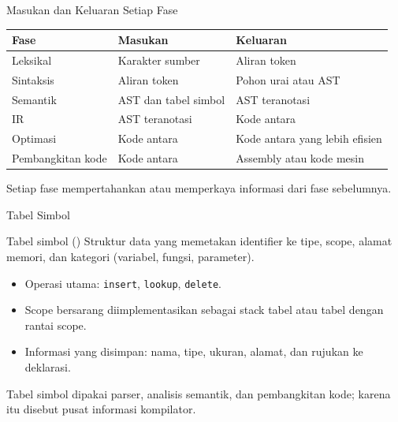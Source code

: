 \documentclass[aspectratio=169,10pt,t]{beamer}
\begin{document}
\begin{frame}{Masukan dan Keluaran Setiap Fase}
  \small
  \begin{tabular}{@{}p{3.1cm}p{5.2cm}p{5.2cm}@{}}
    \toprule
    \textbf{Fase} & \textbf{Masukan} & \textbf{Keluaran} \\
    \midrule
    Leksikal & Karakter sumber & Aliran token \\
    Sintaksis & Aliran token & Pohon urai atau AST \\
    Semantik & AST dan tabel simbol & AST teranotasi \\
    IR & AST teranotasi & Kode antara \\
    Optimasi & Kode antara & Kode antara yang lebih efisien \\
    Pembangkitan kode & Kode antara & Assembly atau kode mesin \\
    \bottomrule
  \end{tabular}

  \vspace{4pt}
  {\footnotesize Setiap fase mempertahankan atau memperkaya informasi
  dari fase sebelumnya.}
\end{frame}

\begin{frame}{Tabel Simbol}
  \begin{block}{Tabel simbol ()}
    Struktur data yang memetakan identifier ke tipe, scope, alamat
    memori, dan kategori (variabel, fungsi, parameter).
  \end{block}

  \begin{itemize}
    \item Operasi utama: \texttt{insert}, \texttt{lookup}, \texttt{delete}.
    \item Scope bersarang diimplementasikan sebagai stack tabel atau
          tabel dengan rantai scope.
    \item Informasi yang disimpan: nama, tipe, ukuran, alamat, dan
          rujukan ke deklarasi.
  \end{itemize}

  \vspace{2pt}
  {\footnotesize\color{ubbblue!80}Tabel simbol dipakai parser, analisis
  semantik, dan pembangkitan kode; karena itu disebut pusat informasi
  kompilator.}
\end{frame}
\end{document}
